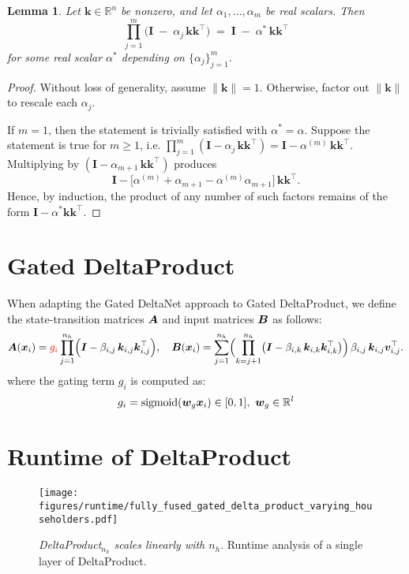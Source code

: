 \documentclass{article} %
\newtheorem{lemma}{Lemma}
\begin{document}
\begin{lemma}\label{lemma:product_rank1_same_direction}
  Let $\mathbf{k}\in\mathbb{R}^n$ be nonzero, and let 
  $\alpha_1,\dots,\alpha_m$ be real scalars. Then
  \[
     \prod_{j=1}^m 
     \bigl(\mathbf{I} \;-\; \alpha_j\, \mathbf{k}\mathbf{k}^\top \bigr)
     \;=\;
     \mathbf{I}
     \;-\;
     \alpha^*\,
     \mathbf{k}\mathbf{k}^\top
  \]
  for some real scalar $\alpha^*$ depending on $\{\alpha_j\}_{j=1}^m$. 
\end{lemma}

\begin{proof}
Without loss of generality, assume $\|\mathbf{k}\|=1$. Otherwise, factor out $\|\mathbf{k}\|$ to rescale each $\alpha_j$.

If $m=1$, then the statement is trivially satisfied with $\alpha^* = \alpha$.
Suppose the statement is true for $m \geq 1$, i.e.\@ 
\(
   \prod_{j=1}^m (\mathbf{I} - \alpha_j\, \mathbf{k}\mathbf{k}^\top)
   =
   \mathbf{I} - \alpha^{(m)}\,\mathbf{k}\mathbf{k}^\top.
\)
Multiplying by \((\mathbf{I} - \alpha_{m+1}\,\mathbf{k}\mathbf{k}^\top)\) produces
\[
   \mathbf{I} - \bigl[\alpha^{(m)} + \alpha_{m+1} - \alpha^{(m)}\alpha_{m+1}\bigr]
   \,\mathbf{k}\mathbf{k}^\top.
\]
Hence, by induction, the product of any number of such factors remains of the form 
\(\mathbf{I} - \alpha^* \mathbf{k}\mathbf{k}^\top\).
\end{proof}


\section{Gated DeltaProduct}
\label{app:gated_delta_product}

When adapting the Gated DeltaNet approach to Gated DeltaProduct, we define the state-transition matrices \( {\bm{A}} \) and input matrices \( {\bm{B}} \) as follows:
\[
{\bm{A}}({\bm{x}}_i) = \textcolor{red}{g_i} \prod_{j=1}^{n_h} \Bigl({\bm{I}} - \beta_{i,j}\,{\bm{k}}_{i,j}{\bm{k}}_{i,j}^\top\Bigr), \quad
{\bm{B}}({\bm{x}}_i) = \sum_{j=1}^{n_h} \Bigl(\prod_{k=j+1}^{n_h} \bigl({\bm{I}} - \beta_{i,k}\,{\bm{k}}_{i,k}{\bm{k}}_{i,k}^\top\bigr)\Bigr)\,\beta_{i,j}\,{\bm{k}}_{i,j}{\bm{v}}_{i,j}^\top.
\]
where the gating term \( g_i \) is computed as:
\[
g_i = \text{sigmoid}({\bm{w}}_g {\bm{x}}_i) \in [0, 1],~{\bm{w}}_g\in \mathbb{R}^l
\]


\section{Runtime of DeltaProduct}\label{app:runtime}
\begin{figure}[ht]
    \centering
    \texttt{[image: figures/runtime/fully\_fused\_gated\_delta\_product\_varying\_householders.pdf]}
    \caption{\textit{DeltaProduct$_{n_h}$ scales linearly with $n_h$}. Runtime analysis of a single layer of DeltaProduct.}
    \label{fig:runtime}
\end{figure}
\end{document}
